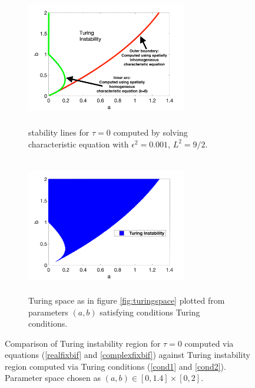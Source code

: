 \begin{figure}[H]
    \centering
    \begin{subfigure}[t]{0.47\textwidth}
        \centering
        \includegraphics[width=7cm,height = 6cm]{bif0.png}
        \caption{stability lines for $\tau=0$ computed by solving characteristic equation with $\epsilon^2=0.001$, $L^2=9/2$.}
        \label{fig:bif0}
    \end{subfigure}
    \hfill
    \begin{subfigure}[t]{0.47\textwidth}
        \centering
        \includegraphics[width=7cm,height = 6cm]{turingspace.png}
        \caption{Turing space as in figure \ref{fig:turingspace} plotted from parameters $(a,b)$ satisfying conditions Turing conditions.}
        \label{}
    \end{subfigure}
    \caption{Comparison of Turing instability region for $\tau=0$ computed via equations (\eqref{realfixbif} and \eqref{complexfixbif}) against Turing instability region computed via Turing conditions (\eqref{cond1} and \eqref{cond2}). Parameter space chosen as $(a,b)\in[0,1.4]\times[0,2]$.}
    \label{fig:tspace1}
\end{figure}

